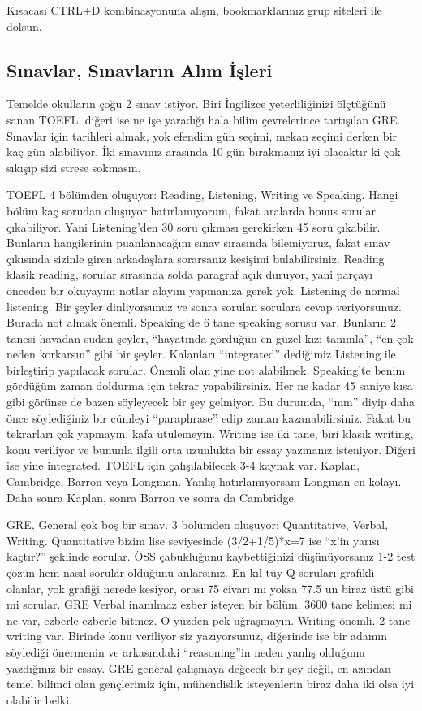\documentclass[12pt]{article}
\begin{document}
Kısacası CTRL+D kombinasyonuna alışın, bookmarklarınız grup siteleri ile dolsun.  

\subsection{Sınavlar, Sınavların Alım İşleri}
Temelde okulların çoğu 2 sınav istiyor. Biri İngilizce yeterliliğinizi ölçtüğünü sanan TOEFL, diğeri ise ne işe yaradığı hala bilim çevrelerince tartışılan GRE. Sınavlar için tarihleri almak, yok efendim gün seçimi, mekan seçimi derken bir kaç gün alabiliyor. İki sınavınız arasında 10 gün bırakmanız iyi olacaktır ki çok sıkışıp sizi strese sokmasın. 

TOEFL 4 bölümden oluşuyor: Reading, Listening, Writing ve Speaking. Hangi bölüm kaç sorudan oluşuyor hatırlamıyorum, fakat aralarda bonus sorular çıkabiliyor. Yani Listening'den 30 soru çıkması gerekirken 45 soru çıkabilir. Bunların hangilerinin puanlanacağını sınav sırasında bilemiyoruz, fakat sınav çıkısında sizinle giren arkadaşlara sorarsanız kesişimi bulabilirsiniz. Reading klasik reading, sorular sırasında solda paragraf açık duruyor, yani parçayı önceden bir okuyayım notlar alayım yapmanıza gerek yok. Listening de normal listening. Bir şeyler dinliyorsunuz ve sonra sorulan sorulara cevap veriyorsunuz. Burada not almak önemli. Speaking'de 6 tane speaking sorusu var. Bunların 2 tanesi havadan sudan şeyler, “hayatında gördüğün en güzel kızı tanımla'', “en çok neden korkarsın'' gibi bir şeyler. Kalanları ``integrated'' dediğimiz Listening ile birleştirip yapılacak sorular. Önemli olan yine not alabilmek. Speaking'te benim gördüğüm zaman doldurma için tekrar yapabilirsiniz. Her ne kadar 45 saniye kısa gibi görünse de bazen söyleyecek bir şey gelmiyor. Bu durumda, “mm” diyip daha önce söylediğiniz bir cümleyi ``paraphrase'' edip zaman kazanabilirsiniz.  Fakat bu tekrarları çok yapmayın, kafa ütülemeyin. Writing ise iki tane, biri klasik writing, konu veriliyor ve bununla ilgili orta uzunlukta bir essay yazmanız isteniyor. Diğeri ise yine integrated. TOEFL için çalışılabilecek 3-4 kaynak var. Kaplan, Cambridge, Barron veya Longman. Yanlış hatırlamıyorsam Longman en kolayı. Daha sonra Kaplan, sonra Barron ve sonra da Cambridge.  

GRE, General çok boş bir sınav. 3 bölümden oluşuyor: Quantitative, Verbal, Writing. Quantitative bizim lise seviyesinde (3/2+1/5)*x=7 ise “x’in yarısı kaçtır?'' şeklinde sorular. ÖSS çabukluğunu kaybettiğinizi düşünüyorsanız 1-2 test çözün hem nasıl sorular olduğunu anlarsınız. En kıl tüy Q soruları grafikli olanlar, yok grafiği nerede kesiyor, orası 75 civarı mı yoksa 77.5 un biraz üstü gibi mi sorular. GRE Verbal inanılmaz ezber isteyen bir bölüm. 3600 tane kelimesi mi ne var, ezberle ezberle bitmez. O yüzden pek uğraşmayın. Writing önemli. 2 tane writing var. Birinde konu veriliyor siz yazıyorsunuz, diğerinde ise bir adamın söylediği önermenin ve arkasındaki ``reasoning''in neden yanlış olduğunu yazdığınız bir essay. GRE general çalışmaya değecek bir şey değil, en azından temel bilimci olan gençlerimiz için, mühendislik isteyenlerin biraz daha iki olsa iyi olabilir belki.  
\end{document}
